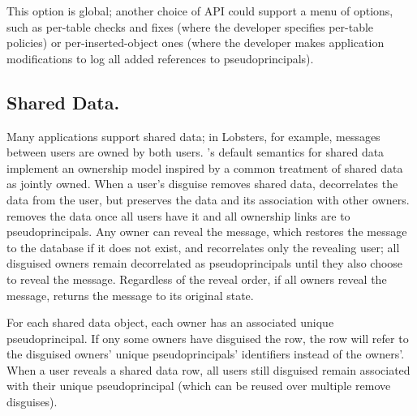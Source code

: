 This option is global; another choice of API could support a menu of
options, such as per-table checks and fixes (where the developer specifies
per-table policies) or per-inserted-object ones (where the developer makes
application modifications to log all added references to pseudoprincipals).
%

\subsection{Shared Data.}

%
Many applications support shared data; in Lobsters, for example, messages
between users are owned by both users.
%
\sys's default semantics for shared data implement an ownership model inspired
by a common treatment of shared data as jointly owned.
%
When a user's disguise removes shared data, \sys decorrelates the data from the \xxing user,
but preserves the data and its association with other owners.
%
\sys removes the data once all users have \xxed it and all ownership links are
to pseudoprincipals.
%
Any owner can reveal the message, which restores the message to the database if
it does not exist, and recorrelates only the revealing user; all disguised
owners remain decorrelated as pseudoprincipals until they also choose to reveal
the message.
%
Regardless of the reveal order, if all owners reveal the message, \sys returns
the message to its original state.
%

%
For each shared data object, each owner has an associated unique
pseudoprincipal. If ony some owners have disguised the row, the row will refer
to the disguised owners' unique pseudoprincipals' identifiers instead of the
owners'.
%
When a user reveals a shared data row, all users still disguised remain 
associated with their unique pseudoprincipal (which can be reused over
multiple remove disguises).
%

